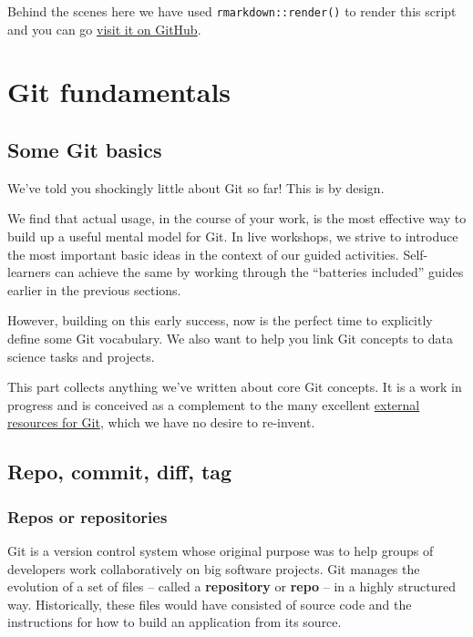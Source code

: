 \documentclass[
]{book}
\begin{document}
Behind the scenes here we have used \texttt{rmarkdown::render()} to render this script and you can go \href{https://github.com/jennybc/happy-git-with-r/blob/master/render-r-script-demo.md}{visit it on GitHub}.

\part{Git fundamentals}\label{part-git-fundamentals}

\chapter*{Some Git basics}\label{git-intro}

We've told you shockingly little about Git so far! This is by design.

We find that actual usage, in the course of your work, is the most effective way to build up a useful mental model for Git. In live workshops, we strive to introduce the most important basic ideas in the context of our guided activities. Self-learners can achieve the same by working through the ``batteries included'' guides earlier in the previous sections.

However, building on this early success, now is the perfect time to explicitly define some Git vocabulary. We also want to help you link Git concepts to data science tasks and projects.

This part collects anything we've written about core Git concepts. It is a work in progress and is conceived as a complement to the many excellent \hyperref[resources]{external resources for Git}, which we have no desire to re-invent.

\chapter{Repo, commit, diff, tag}\label{git-basics}

\section{Repos or repositories}\label{repos-or-repositories}

Git is a version control system whose original purpose was to help groups of
developers work collaboratively on big software projects. Git manages the
evolution of a set of files -- called a \textbf{repository} or \textbf{repo} -- in a highly structured way. Historically, these files would have consisted of source code and the instructions for how to build an application from its source.
\end{document}

